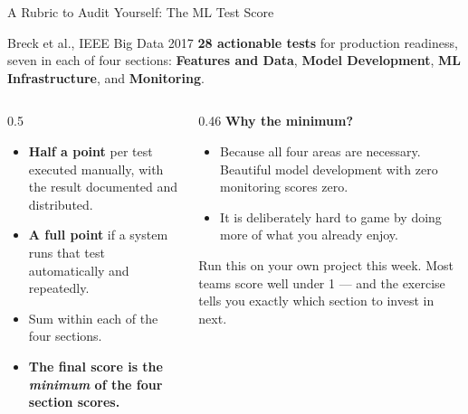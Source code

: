 
\begin{frame}{A Rubric to Audit Yourself: The ML Test Score}

    \begin{block}{Breck et al., IEEE Big Data 2017}
        \textbf{28 actionable tests} for production readiness, seven in each of four sections:
        \textbf{Features and Data}, \textbf{Model Development}, \textbf{ML Infrastructure}, and
        \textbf{Monitoring}.
    \end{block}

    \vspace{0.15em}
    \begin{columns}[T]
        \begin{column}{0.5\textwidth}
            \begin{tcolorbox}[colback=green!5, colframe=green!50!black, title=\scriptsize How it is scored]
                \scriptsize
                \begin{itemize}
                    \item \textbf{Half a point} per test executed manually, with the result documented and
                          distributed.
                    \item \textbf{A full point} if a system runs that test automatically and repeatedly.
                    \item Sum within each of the four sections.
                    \item \textbf{The final score is the \emph{minimum} of the four section scores.}
                \end{itemize}
            \end{tcolorbox}
        \end{column}
        \begin{column}{0.46\textwidth}
            \scriptsize
            \textbf{Why the minimum?}
            \begin{itemize}
                \item Because all four areas are necessary. Beautiful model development with zero monitoring
                      scores zero.
                \item It is deliberately hard to game by doing more of what you already enjoy.
            \end{itemize}
            \vspace{0.12em}
            \begin{tcolorbox}[colback=yellow!8, colframe=yellow!50!black, boxrule=0.5pt]
                \scriptsize Run this on your own project this week. Most teams score well under 1 --- and the
                exercise tells you exactly which section to invest in next.
            \end{tcolorbox}
        \end{column}
    \end{columns}


\end{frame}
